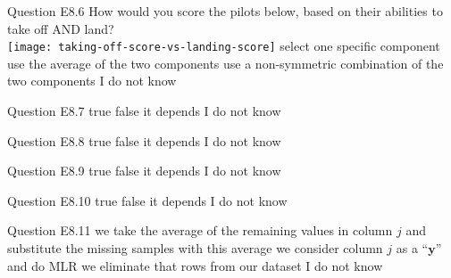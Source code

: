 \begin{frame}{Question E8.6}
	\QuestionBody
	{
		How would you score the pilots below, based on their abilities to take off AND land? \vspace{0.1cm} \\
		\centering
		\texttt{[image: taking-off-score-vs-landing-score]}
	}
	\QuestionAnswers
	{
		\answer select one specific component
		\answer use the average of the two components
		\correctanswer use a non-symmetric combination of the two components
		\answer I do not know
	}
	\QuestionSolution{}
\end{frame}


\begin{frame}{Question E8.7}
	\QuestionAnswers
	{
		\correctanswer true
		\answer false
		\answer it depends
		\answer I do not know
	}
	\QuestionSolution{}
\end{frame}


\begin{frame}{Question E8.8}
	\QuestionAnswers
	{
		\answer true
		\correctanswer false
		\answer it depends
		\answer I do not know
	}
	\QuestionSolution{}
\end{frame}


\begin{frame}{Question E8.9}
	\QuestionAnswers
	{
		\correctanswer true
		\answer false
		\answer it depends
		\answer I do not know
	}
	\QuestionSolution{}
\end{frame}


\begin{frame}{Question E8.10}
	\QuestionAnswers
	{
		\correctanswer true
		\answer false
		\answer it depends
		\answer I do not know
	}
	\QuestionSolution{}
\end{frame}


\begin{frame}{Question E8.11}
	\QuestionAnswers
	{
		\answer we take the average of the remaining values in column $j$ and substitute the missing samples with this average
		\correctanswer we consider column $j$ as a ``$\bm{y}$'' and do MLR
		\answer we eliminate that rows from our dataset
		\answer I do not know
	}
	\QuestionSolution{}
\end{frame}


